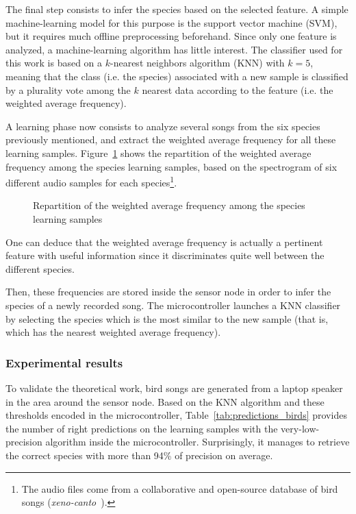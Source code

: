 \documentclass{EPL-master-thesis-covers-EN}
\begin{document}
The final step consists to infer the species based on the selected feature. A simple machine-learning model for this purpose is the support vector machine (SVM), but it requires much offline preprocessing beforehand. Since only one feature is analyzed, a machine-learning algorithm has little interest. The classifier used for this work is based on a $k$-nearest neighbors algorithm (KNN) with $k=5$, meaning that the class (i.e. the species) associated with a new sample is classified by a plurality vote among the $k$ nearest data according to the feature (i.e. the weighted average frequency).

A learning phase now consists to analyze several songs from the six species previously mentioned, and extract the weighted average frequency for all these learning samples. Figure~\ref{fig:weighted_average_frequency} shows the repartition of the weighted average frequency among the species learning samples, based on the spectrogram of six different audio samples for each species\footnote{The audio files come from a collaborative and open-source database of bird songs (\textit{xeno-canto}~\cite{xeno}).}.

\begin{figure}[H]
    \centering
    
    \caption{Repartition of the weighted average frequency among the species learning samples}
    \label{fig:weighted_average_frequency}
\end{figure}

One can deduce that the weighted average frequency is actually a pertinent feature with useful information since it discriminates quite well between the different species.

Then, these frequencies are stored inside the sensor node in order to infer the species of a newly recorded song. The microcontroller launches a KNN classifier by selecting the species which is the most similar to the new sample (that is, which has the nearest weighted average frequency).

\subsubsection*{Experimental results}

To validate the theoretical work, bird songs are generated from a laptop speaker in the area around the sensor node.
Based on the KNN algorithm and these thresholds encoded in the microcontroller, Table~\ref{tab:predictions_birds} provides the number of right predictions on the learning samples with the very-low-precision algorithm inside the microcontroller. Surprisingly, it manages to retrieve the correct species with more than 94\% of precision on average.
\end{document}
